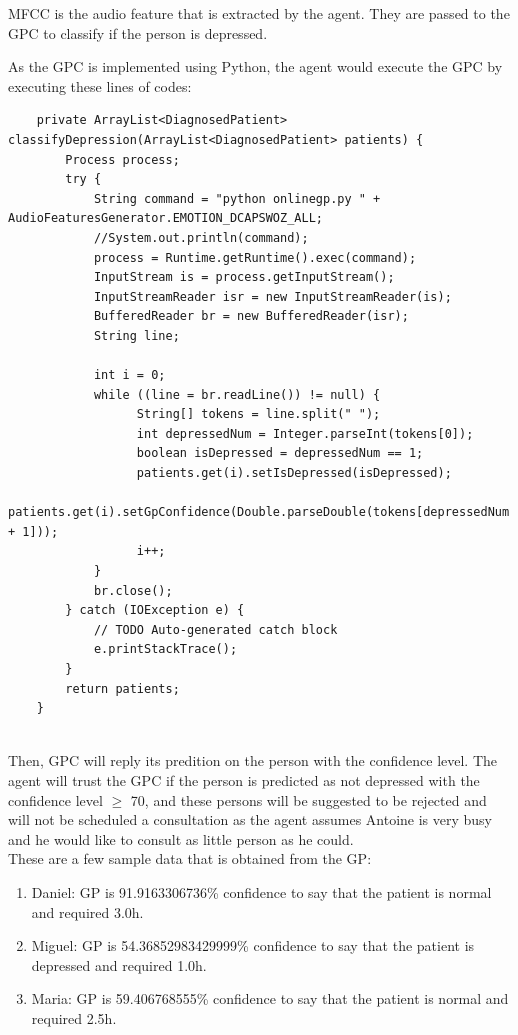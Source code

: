 \documentclass{article}
\begin{document}
	MFCC is the audio feature that is extracted by the agent. They are passed to the GPC to classify if the person is depressed. 

	As the GPC is implemented using Python, the agent would execute the GPC by executing these lines of codes:

	\begin{lstlisting}
	private ArrayList<DiagnosedPatient> classifyDepression(ArrayList<DiagnosedPatient> patients) {
		Process process;
		try {
			String command = "python onlinegp.py " + AudioFeaturesGenerator.EMOTION_DCAPSWOZ_ALL;
			//System.out.println(command);
			process = Runtime.getRuntime().exec(command);
			InputStream is = process.getInputStream();
			InputStreamReader isr = new InputStreamReader(is);
			BufferedReader br = new BufferedReader(isr);
			String line;
			
			int i = 0;
			while ((line = br.readLine()) != null) {
				  String[] tokens = line.split(" ");
				  int depressedNum = Integer.parseInt(tokens[0]);
				  boolean isDepressed = depressedNum == 1;
				  patients.get(i).setIsDepressed(isDepressed);
				  patients.get(i).setGpConfidence(Double.parseDouble(tokens[depressedNum + 1])); 
				  i++;
			}
			br.close();
		} catch (IOException e) {
			// TODO Auto-generated catch block
			e.printStackTrace();
		}
		return patients;
	}
	
	\end{lstlisting}

	Then, GPC will reply its predition on the person with the confidence level.
	The agent will trust the GPC if the person is predicted as not depressed with the confidence level \(\geq\) 70,
	and these persons will be suggested to be rejected and will not be scheduled a consultation as the agent assumes Antoine is very busy and 
	he would like to consult as little person as he could.
	\\

	These are a few sample data that is obtained from the GP:
	\begin{enumerate}
     	\item Daniel: GP is 91.9163306736\% confidence to say that the patient is normal and required 3.0h.
		\item Miguel: GP is 54.36852983429999\% confidence to say that the patient is depressed and required 1.0h.
		\item Maria: GP is 59.406768555\% confidence to say that the patient is normal and required 2.5h.
     \end{enumerate}
\end{document}
